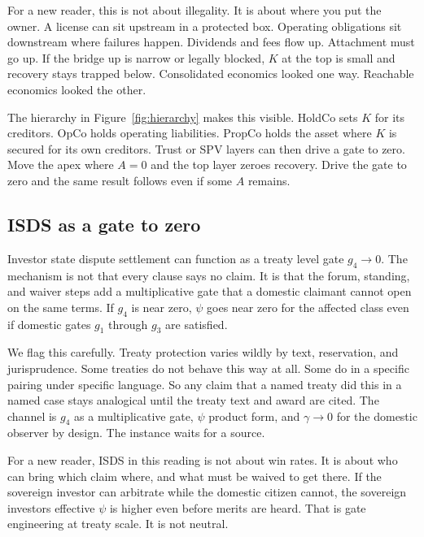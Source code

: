 \documentclass[11pt]{article}
\begin{document}
For a new reader, this is not about illegality. It is about where you put the owner. A license can sit upstream in a protected box. Operating obligations sit downstream where failures happen. Dividends and fees flow up. Attachment must go up. If the bridge up is narrow or legally blocked, $K$ at the top is small and recovery stays trapped below. Consolidated economics looked one way. Reachable economics looked the other.

The hierarchy in Figure~\ref{fig:hierarchy} makes this visible. HoldCo sets $K$ for its creditors. OpCo holds operating liabilities. PropCo holds the asset where $K$ is secured for its own creditors. Trust or SPV layers can then drive a gate to zero. Move the apex where $A=0$ and the top layer zeroes recovery. Drive the gate to zero and the same result follows even if some $A$ remains.

\subsection{ISDS as a gate to zero}

Investor state dispute settlement can function as a treaty level gate $g_4\to0$. The mechanism is not that every clause says no claim. It is that the forum, standing, and waiver steps add a multiplicative gate that a domestic claimant cannot open on the same terms. If $g_4$ is near zero, $\psi$ goes near zero for the affected class even if domestic gates $g_1$ through $g_3$ are satisfied.

We flag this carefully. Treaty protection varies wildly by text, reservation, and jurisprudence. Some treaties do not behave this way at all. Some do in a specific pairing under specific language. So any claim that a named treaty did this in a named case stays analogical until the treaty text and award are cited. The channel is $g_4$ as a multiplicative gate, $\psi$ product form, and $\gamma\to0$ for the domestic observer by design. The instance waits for a source.

For a new reader, ISDS in this reading is not about win rates. It is about who can bring which claim where, and what must be waived to get there. If the sovereign investor can arbitrate while the domestic citizen cannot, the sovereign investors effective $\psi$ is higher even before merits are heard. That is gate engineering at treaty scale. It is not neutral.
\end{document}
